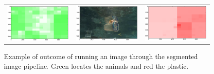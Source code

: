 \begin{figure}
\begin{tabular}{ccc}
\includegraphics[keepaspectratio=true,width=\segwidth]{images/segment/20607_01__animals__.png} &
\includegraphics[keepaspectratio=true,width=\segwidth]{images/segment/20607_01__image__.png} &
\includegraphics[keepaspectratio=true,width=\segwidth]{images/segment/20607_01__plastic__.png}
	\end{tabular}
\fi
\captionsetup{width=.8\textwidth}
\caption{Example of outcome of running an image through the segmented image pipeline. Green locates the animals and red the plastic.}
\label{fig:sub-matrix}
\end{figure}